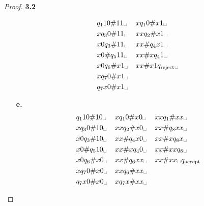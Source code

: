 \documentclass[11pt]{article}
\newcommand{\esp}{\text{\textvisiblespace}\hspace{0.1em}}
\theoremstyle{definition}
\begin{document}
\begin{proof}{\textbf{3.2}}
\begin{itemize}
\[\begin{aligned}
            & q_1 1 0 \# 1 1 \esp  &  & x q_1 0 \# x 1 \esp\\
            & x q_3 0 \# 1 1 \esp  &  & x x q_2 \# x 1 \esp\\
            & x 0 q_3 \# 1 1 \esp  &  & x x \# q_4 x 1 \esp\\
            & x 0 \# q_5 1 1 \esp  &  & x x \# x q_4 1 \esp\\
            & x 0 q_6 \# x 1 \esp  &  & x x \# x 1 q_{\text{reject}}\esp\\
            & x q_7 0 \# x 1 \esp  &  & \\
            & q_7 x 0 \# x 1 \esp  &  & 
        \end{aligned}
        \]
        \item [\textbf{e.}] 
        \[
        \begin{aligned}
            & q_1 1 0 \# 1 0 \esp  &  & x q_1 0 \# x 0 \esp  &  & x x q_1 \# x x \esp\\
            & x q_3 0 \# 1 0 \esp  &  & x x q_2 \# x 0 \esp  &  & x x \# q_8 x x \esp\\
            & x 0 q_3 \# 1 0 \esp  &  & x x \# q_4 x 0 \esp  &  & x x \# x q_8 x \esp\\
            & x 0 \# q_5 1 0 \esp  &  & x x \# x q_4 0 \esp  &  & x x \# x x q_8 \esp\\
            & x 0 q_6 \# x 0 \esp  &  & x x \# q_6 x x \esp  &  & x x \# x x \esp q_{\text{accept}}\\
            & x q_7 0 \# x 0 \esp  &  & x x q_6 \# x x \esp\\
            & q_7 x 0 \# x 0 \esp  &  & x q_7 x \# x x \esp
        \end{aligned}
        \]
    \end{itemize}
\end{proof}
\end{document}
